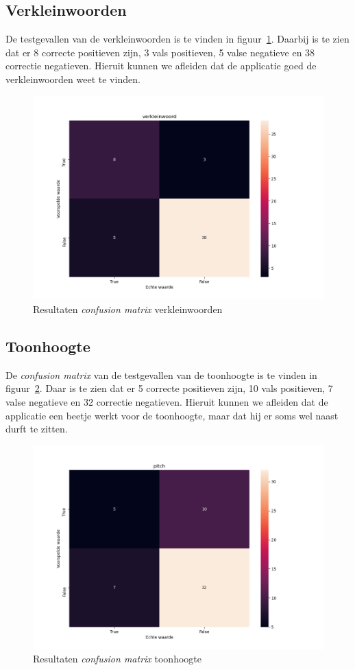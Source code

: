 \subsection{Verkleinwoorden}
De testgevallen van de verkleinwoorden is te vinden in figuur~\ref{fig:cfm_verkleinwoord}. Daarbij is te zien dat er 8 correcte positieven zijn, 3 vals positieven, 5 valse negatieve en 38 correctie negatieven.
Hieruit kunnen we afleiden dat de applicatie goed de verkleinwoorden weet te vinden.
\begin{figure}
	\centering
	\includegraphics[width=1\textwidth]{./img/cfm_verkleinwoord}
	\caption{\label{fig:cfm_verkleinwoord} Resultaten \textit{confusion matrix} verkleinwoorden}
\end{figure}


\subsection{Toonhoogte}
De \textit{confusion matrix} van de testgevallen van de toonhoogte is te vinden in figuur~\ref{fig:cfm_pitch}. Daar is te zien dat er 5 correcte positieven zijn, 10 vals positieven, 7 valse negatieve en 32 correctie negatieven.
Hieruit kunnen we afleiden dat de applicatie een beetje werkt voor de toonhoogte, maar dat hij er soms wel naast durft te zitten.
\begin{figure}
	\centering
	\includegraphics[width=1\textwidth]{./img/cfm_pitch}
	\caption{\label{fig:cfm_pitch} Resultaten \textit{confusion matrix} toonhoogte}
\end{figure}

